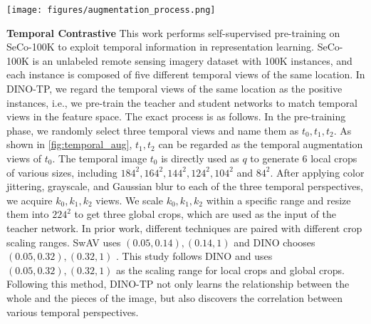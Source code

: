 \documentclass[10pt,twocolumn,letterpaper]{article}
\begin{document}
\begin{figure*}
  \centering
  \texttt{[image: figures/augmentation\_process.png]}
  \caption{
  The process of handling temporal views of contrastive learning in DINO-TP.
  We randomly select three temporal views of the same location and augment them to obtain global and local crops, which is the input of the teacher and student network.
  Different temporal views of the same location in DINO-TP are considered as positive examples, and we train the model to match their representations in the feature space.
  }
  \label{fig:temporal_aug}
\end{figure*}

\textbf{Temporal Contrastive } 
This work performs self-supervised pre-training on SeCo-100K \cite{manas2021seasonal} to exploit temporal information in representation learning.
SeCo-100K is an unlabeled remote sensing imagery dataset with 100K instances, and each instance is composed of five different temporal views of the same location.
In DINO-TP, we regard the temporal views of the same location as the positive instances, i.e., we pre-train the teacher and student networks to match temporal views in the feature space.
The exact process is as follows.
In the pre-training phase, we randomly select three temporal views and name them as $t_0, t_1, t_2$.
As shown in \cref{fig:temporal_aug}, $t_1, t_2$ can be regarded as the temporal augmentation views of $t_0$.
The temporal image $t_0$ is directly used as $q$ to generate $6$ local crops of various sizes, including $184^2, 164^2, 144^2, 124^2, 104^2$ and $84^2$.
After applying color jittering, grayscale, and Gaussian blur to each of the three temporal perspectives, we acquire $k_0, k_1, k_2$ views.
We scale $k_0, k_1, k_2$ within a specific range and resize them into $224^2$ to get three global crops, which are used as the input of the teacher network.
In prior work, different techniques are paired with different crop scaling ranges.
SwAV uses $(0.05, 0.14), (0.14, 1)$ \cite{caron2020unsupervised} and DINO chooses $(0.05, 0.32), (0.32, 1)$ \cite{caron2021emerging}.
This study follows DINO and uses $(0.05, 0.32), (0.32, 1)$ as the scaling range for local crops and global crops.
Following this method, DINO-TP not only learns the relationship between the whole and the pieces of the image, but also discovers the correlation between various temporal perspectives.
\end{document}
